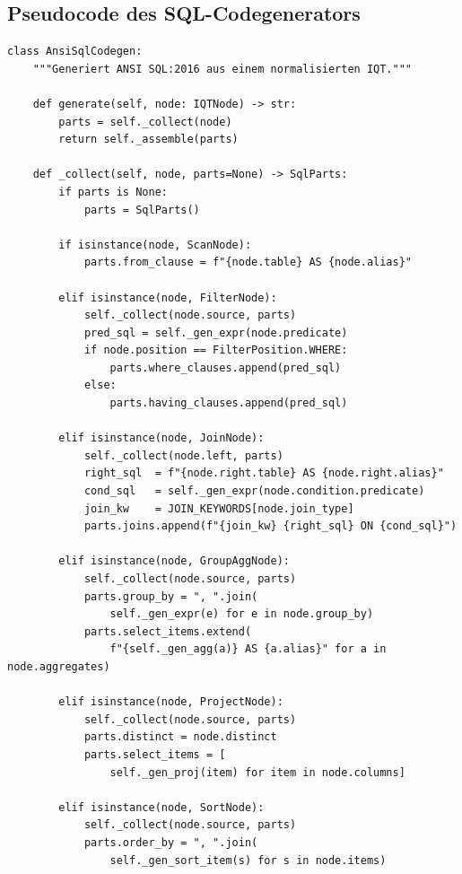 \subsection{Pseudocode des SQL-Codegenerators}
\label{subsec:impl_codegen}

\begin{lstlisting}[style=pythonstyle, caption={SQL-Codegenerator: IQT nach ANSI SQL},
  label=lst:impl_codegen]
class AnsiSqlCodegen:
    """Generiert ANSI SQL:2016 aus einem normalisierten IQT."""

    def generate(self, node: IQTNode) -> str:
        parts = self._collect(node)
        return self._assemble(parts)

    def _collect(self, node, parts=None) -> SqlParts:
        if parts is None:
            parts = SqlParts()

        if isinstance(node, ScanNode):
            parts.from_clause = f"{node.table} AS {node.alias}"

        elif isinstance(node, FilterNode):
            self._collect(node.source, parts)
            pred_sql = self._gen_expr(node.predicate)
            if node.position == FilterPosition.WHERE:
                parts.where_clauses.append(pred_sql)
            else:
                parts.having_clauses.append(pred_sql)

        elif isinstance(node, JoinNode):
            self._collect(node.left, parts)
            right_sql  = f"{node.right.table} AS {node.right.alias}"
            cond_sql   = self._gen_expr(node.condition.predicate)
            join_kw    = JOIN_KEYWORDS[node.join_type]
            parts.joins.append(f"{join_kw} {right_sql} ON {cond_sql}")

        elif isinstance(node, GroupAggNode):
            self._collect(node.source, parts)
            parts.group_by = ", ".join(
                self._gen_expr(e) for e in node.group_by)
            parts.select_items.extend(
                f"{self._gen_agg(a)} AS {a.alias}" for a in node.aggregates)

        elif isinstance(node, ProjectNode):
            self._collect(node.source, parts)
            parts.distinct = node.distinct
            parts.select_items = [
                self._gen_proj(item) for item in node.columns]

        elif isinstance(node, SortNode):
            self._collect(node.source, parts)
            parts.order_by = ", ".join(
                self._gen_sort_item(s) for s in node.items)


\end{lstlisting}

